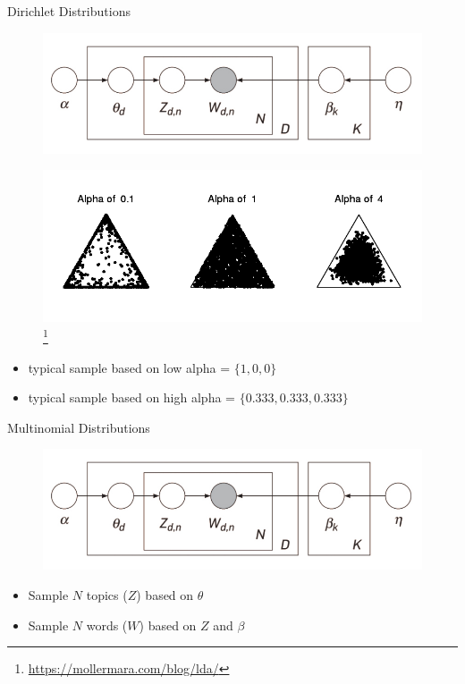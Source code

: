 \begin{frame}{\insertsubsection}{Dirichlet Distributions}
	\begin{figure}
		\centering
		\includegraphics[width = 0.65 \textwidth]{figures/lda_model.jpg}
	\end{figure}
	\begin{figure}
		\centering
		\includegraphics[width = 0.65 \textwidth]{figures/dirich.png}
		\footnote{\url{https://mollermara.com/blog/lda/}}
	\end{figure}
	\begin{itemize}
		\item<2> typical sample based on low alpha = $\{1,0,0\}$
		\item<2> typical sample based on high alpha = $\{0.333, 0.333, 0.333\}$
	\end{itemize}
\end{frame}

\begin{frame}{\insertsubsection}{Multinomial Distributions}
	\begin{figure}
		\centering
		\includegraphics[width = 0.65 \textwidth]{figures/lda_model.jpg}
	\end{figure}
	\begin{itemize}
		\item Sample $N$ topics ($Z$) based on $\theta$
		\item Sample $N$ words ($W$) based on $Z$ and $\beta$
	\end{itemize}
\end{frame}

